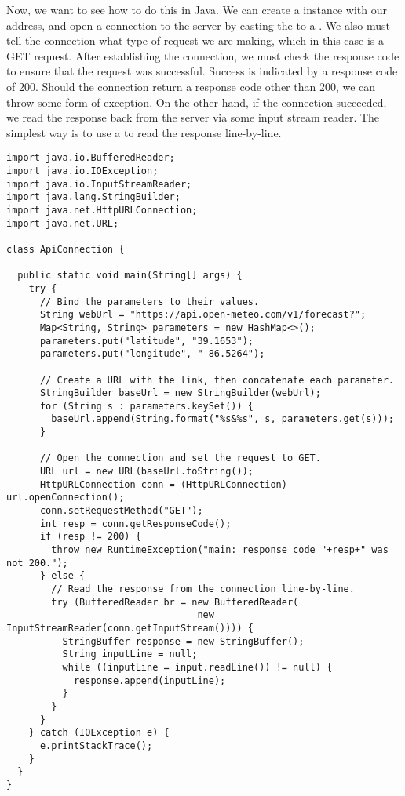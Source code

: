 Now, we want to see how to do this in Java. We can create a  instance with our address, and open a connection to the server by casting the  to a . We also must tell the connection what type of request we are making, which in this case is a GET request. After establishing the connection, we must check the response code to ensure that the request was successful. Success is indicated by a response code of 200. Should the connection return a response code other than 200, we can throw some form of exception. On the other hand, if the connection succeeded, we read the response back from the server via some input stream reader. The simplest way is to use a  to read the response line-by-line.

\begin{cl}[]{}
\begin{lstlisting}[language=MyJava]
import java.io.BufferedReader;
import java.io.IOException;
import java.io.InputStreamReader;
import java.lang.StringBuilder;
import java.net.HttpURLConnection;
import java.net.URL;

class ApiConnection {

  public static void main(String[] args) {
    try {
      // Bind the parameters to their values.
      String webUrl = "https://api.open-meteo.com/v1/forecast?";
      Map<String, String> parameters = new HashMap<>();
      parameters.put("latitude", "39.1653");
      parameters.put("longitude", "-86.5264");

      // Create a URL with the link, then concatenate each parameter.
      StringBuilder baseUrl = new StringBuilder(webUrl);
      for (String s : parameters.keySet()) { 
        baseUrl.append(String.format("%s&%s", s, parameters.get(s))); 
      }
    
      // Open the connection and set the request to GET.
      URL url = new URL(baseUrl.toString());
      HttpURLConnection conn = (HttpURLConnection) url.openConnection();
      conn.setRequestMethod("GET");
      int resp = conn.getResponseCode();
      if (resp != 200) {
        throw new RuntimeException("main: response code "+resp+" was not 200.");
      } else {
        // Read the response from the connection line-by-line.
        try (BufferedReader br = new BufferedReader(
                                  new InputStreamReader(conn.getInputStream()))) {
          StringBuffer response = new StringBuffer();
          String inputLine = null;
          while ((inputLine = input.readLine()) != null) { 
            response.append(inputLine); 
          }
        }
      }
    } catch (IOException e) {
      e.printStackTrace();
    }
  }
}
\end{lstlisting}
\end{cl}

